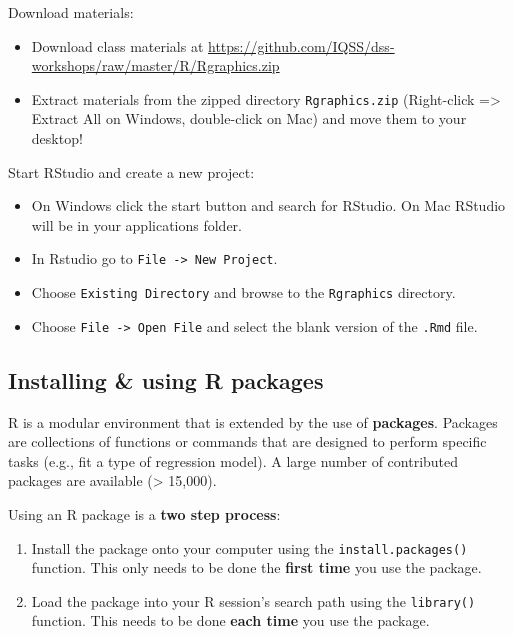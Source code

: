 \documentclass[]{book}
\providecommand{\tightlist}{%
  \setlength{\itemsep}{0pt}\setlength{\parskip}{0pt}}
\begin{document}
Download materials:

\begin{itemize}
\tightlist
\item
  Download class materials at \url{https://github.com/IQSS/dss-workshops/raw/master/R/Rgraphics.zip}
\item
  Extract materials from the zipped directory \texttt{Rgraphics.zip} (Right-click =\textgreater{} Extract All on Windows, double-click on Mac) and move them to your desktop!
\end{itemize}

Start RStudio and create a new project:

\begin{itemize}
\tightlist
\item
  On Windows click the start button and search for RStudio. On Mac
  RStudio will be in your applications folder.
\item
  In Rstudio go to \texttt{File\ -\textgreater{}\ New\ Project}.
\item
  Choose \texttt{Existing\ Directory} and browse to the \texttt{Rgraphics} directory.
\item
  Choose \texttt{File\ -\textgreater{}\ Open\ File} and select the blank version of the \texttt{.Rmd} file.
\end{itemize}

\hypertarget{installing-using-r-packages-2}{%
\subsection{Installing \& using R packages}\label{installing-using-r-packages-2}}

R is a modular environment that is extended by the use of \textbf{packages}.
Packages are collections of functions or commands that are designed to
perform specific tasks (e.g., fit a type of regression model). A large
number of contributed packages are available (\textgreater{} 15,000).

Using an R package is a \textbf{two step process}:

\begin{enumerate}
\def\labelenumi{\arabic{enumi}.}
\item
  Install the package onto your computer using the
  \texttt{install.packages()} function. This only needs to
  be done the \textbf{first time} you use the package.
\item
  Load the package into your R session's search path
  using the \texttt{library()} function. This needs to be done
  \textbf{each time} you use the package.
\end{enumerate}
\end{document}
